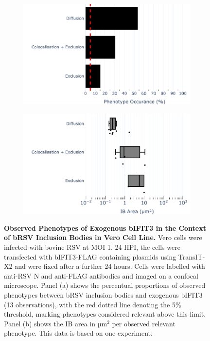 \begin{figure}
    \begin{subfigure}{0.495\textwidth}
        \caption{}
        \includegraphics[width=1\linewidth]{09. Chapter 4/Figs/02. Overexpression/03. IFIT3/04. bar_i3_brsv.pdf} 
    \end{subfigure}
    \begin{subfigure}{0.495\textwidth}
        \caption{}
        \includegraphics[width=1\linewidth]{09. Chapter 4/Figs/02. Overexpression/03. IFIT3/05. box_i3_brsv.pdf}
    \end{subfigure}
    \caption[Observed Phenotypes of Exogenous bIFIT3 in the Context of bRSV Inclusion Bodies in Vero Cell Line.]{\textbf{Observed Phenotypes of Exogenous bIFIT3 in the Context of bRSV Inclusion Bodies in Vero Cell Line.} Vero cells were infected with bovine RSV at MOI 1. 24 HPI, the cells were transfected with bIFIT3-FLAG containing plasmids using TransIT-X2 and were fixed after a further 24 hours. Cells were labelled with anti-RSV N and anti-FLAG antibodies and imaged on a confocal microscope. Panel (a) shows the percentual proportions of observed phenotypes between bRSV inclusion bodies and exogenous bIFIT3 (13 observations), with the red dotted line denoting the 5\% threshold, marking phenotypes considered relevant above this limit. Panel (b) shows the IB area in \(\mbox{µm}^2\) per observed relevant phenotype. This data is based on one experiment.}
    \label{fig:Observed Phenotypes of Exogenous bIFIT3 in the Context of bRSV Inclusion Bodies in VERO Cell Line}
\end{figure}

